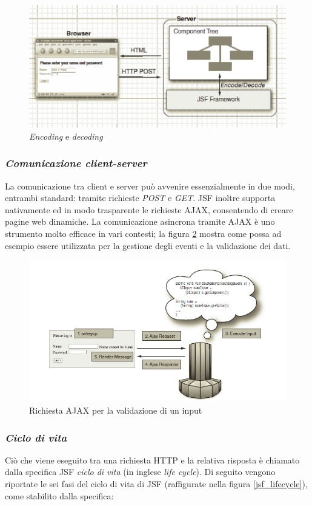 \begin{figure}
	\centering
	\includegraphics{JSF_client-server_communication.png}
	\caption{\textit{Encoding} e \textit{decoding}}
	\label{jsf_cs_comm}
\end{figure}

\subsubsection{\textit{Comunicazione client-server}}
La comunicazione tra client e server può avvenire essenzialmente in due modi, entrambi standard: tramite richieste \textsl{POST} e \textsl{GET}. JSF inoltre supporta nativamente ed in modo trasparente le richieste AJAX, consentendo di creare pagine web dinamiche. La comunicazione asincrona tramite AJAX è uno strumento molto efficace in vari contesti; la figura \ref{jsf_ajax} mostra come possa ad esempio essere utilizzata per la gestione degli eventi e la validazione dei dati.\\

\begin{figure}
	\centering
	\includegraphics{JSF_ajax.png}
	\caption{Richiesta AJAX per la validazione di un input}
	\label{jsf_ajax}
\end{figure}

\subsubsection{\textit{Ciclo di vita}}
Ciò che viene eseguito tra una richiesta HTTP e la relativa risposta è chiamato dalla specifica JSF \textsl{ciclo di vita} (in inglese \textit{life cycle}).
Di seguito vengono riportate le sei fasi del ciclo di vita di JSF (raffigurate nella figura \ref{jsf_lifecycle}), come stabilito dalla specifica:

